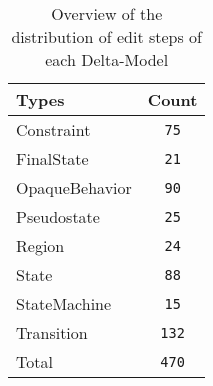 \begin{table} 
 \center 
 \small 
\begin{tabular}{|l|c|}
\hline
Types & Count\\ 
  \hline 
Constraint & \texttt{75}\\ 
  \hline 
FinalState & \texttt{21}\\ 
  \hline 
OpaqueBehavior & \texttt{90}\\ 
  \hline 
Pseudostate & \texttt{25}\\ 
  \hline 
Region & \texttt{24}\\ 
  \hline 
State & \texttt{88}\\ 
  \hline 
StateMachine & \texttt{15}\\ 
  \hline 
Transition & \texttt{132}\\ 
  \hline 
Total & \texttt{470}\\ 
  \hline 
\end{tabular}
\caption[Overview: Delta-Models]{Overview of the distribution of edit steps of each Delta-Model}
\end{table}

